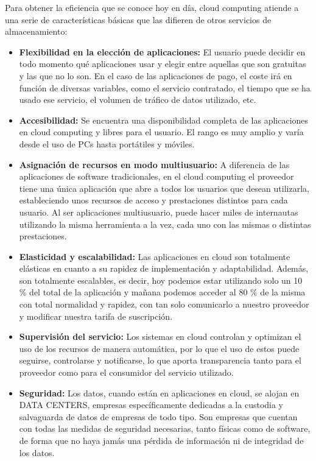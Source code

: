 \documentclass[12pt,a4paper]{article}
\begin{document}
Para obtener la eficiencia que se conoce hoy en día, cloud
computing atiende a una serie de características básicas que las
difieren de otros servicios de almacenamiento:
\begin {itemize}
\item \textbf{Flexibilidad en la elección de aplicaciones:} El
usuario puede decidir en todo momento qué aplicaciones usar y
elegir entre aquellas que son gratuitas y las que no lo son. En
el caso de las aplicaciones de pago, el coste irá en función de
diversas variables, como el servicio contratado, el tiempo que
se ha usado ese servicio, el volumen de tráfico de datos
utilizado, etc.
\item \textbf{Accesibilidad:} Se encuentra una disponibilidad
completa de las aplicaciones en cloud computing y libres para el
usuario. El rango es muy amplio y varía desde el uso de PCs hasta
portátiles y móviles.

\item \textbf{Asignación de recursos en modo multiusuario:} A
diferencia de las aplicaciones de software tradicionales, en el
cloud computing el proveedor tiene una única aplicación que abre
a todos los usuarios que desean utilizarla, estableciendo unos
recursos de acceso y prestaciones distintos para cada usuario.
Al ser aplicaciones multiusuario, puede hacer miles de
internautas utilizando la misma herramienta a la vez, cada uno
con las mismas o distintas prestaciones.

\item \textbf{Elasticidad y escalabilidad:} Las aplicaciones en
cloud son totalmente elásticas en cuanto a su rapidez de
implementación y adaptabilidad. Además, son totalmente
escalables, es decir, hoy podemos estar utilizando solo un 10
\% del total de la aplicación y mañana podemos acceder al 80
\% de la misma con total normalidad y rapidez, con tan solo
comunicarlo a nuestro proveedor y modificar nuestra tarifa de
suscripción.
 
\item \textbf{Supervisión del servicio:} Los sistemas en cloud
controlan y optimizan el uso de los recursos de manera
automática, por lo que el uso de estos puede seguirse,
controlarse y notificarse, lo que aporta transparencia tanto
para el proveedor como para el consumidor del servicio
utilizado.
 
\item \textbf{Seguridad:} Los datos, cuando están en aplicaciones
en cloud, se alojan en DATA CENTERS, empresas específicamente
dedicadas a la custodia y salvaguarda de datos de empresas de
todo tipo. Son empresas que cuentan con todas las medidas de
seguridad necesarias, tanto físicas como de software, de forma
que no haya jamás una pérdida de información ni de integridad de
los datos.
\end{itemize}
\end{document}
